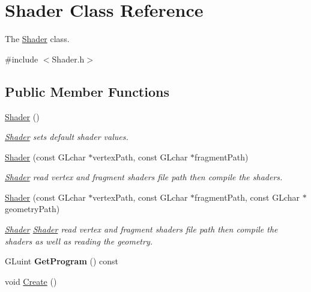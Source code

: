 \hypertarget{class_shader}{}\section{Shader Class Reference}
\label{class_shader}


The \hyperlink{class_shader}{Shader} class.  




{\ttfamily \#include $<$Shader.\+h$>$}

\subsection*{Public Member Functions}
\begin{DoxyCompactItemize}
\item 
\hypertarget{class_shader_a0d654ebaca4e0555197c0724c6d30610}{}\hyperlink{class_shader_a0d654ebaca4e0555197c0724c6d30610}{Shader} ()\label{class_shader_a0d654ebaca4e0555197c0724c6d30610}

\begin{DoxyCompactList}\small\item\em \hyperlink{class_shader}{Shader} sets default shader values. \end{DoxyCompactList}\item 
\hyperlink{class_shader_a03421a8419cdad4b84cf58ecdb156879}{Shader} (const G\+Lchar $\ast$vertex\+Path, const G\+Lchar $\ast$fragment\+Path)
\begin{DoxyCompactList}\small\item\em \hyperlink{class_shader}{Shader} read vertex and fragment shaders file path then compile the shaders. \end{DoxyCompactList}\item 
\hyperlink{class_shader_a764dce935b63a5ba4add880af9e102fa}{Shader} (const G\+Lchar $\ast$vertex\+Path, const G\+Lchar $\ast$fragment\+Path, const G\+Lchar $\ast$geometry\+Path)
\begin{DoxyCompactList}\small\item\em \hyperlink{class_shader}{Shader} \hyperlink{class_shader}{Shader} read vertex and fragment shaders file path then compile the shaders as well as reading the geometry. \end{DoxyCompactList}\item 
\hypertarget{class_shader_ac7d8eeb6d2a6215b73f168906a094e15}{}G\+Luint {\bfseries Get\+Program} () const \label{class_shader_ac7d8eeb6d2a6215b73f168906a094e15}

\item 
\hypertarget{class_shader_ae22f06df368cebeb2e96173d5a6489d0}{}void \hyperlink{class_shader_ae22f06df368cebeb2e96173d5a6489d0}{Create} ()\label{class_shader_ae22f06df368cebeb2e96173d5a6489d0}


\end{DoxyCompactItemize}
